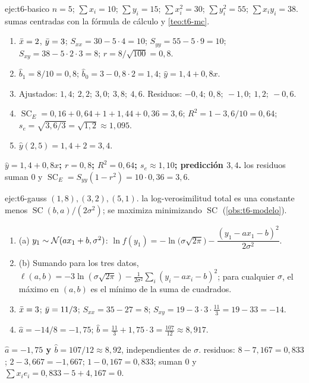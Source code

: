 \begin{solucion}{eje:t6-basico}
\datos $n=5$; $\sum x_i=10$; $\sum y_i=15$; $\sum x_i^{2}=30$; $\sum y_i^{2}=55$; $\sum x_iy_i=38$.
\planteamiento sumas centradas con la fórmula de cálculo y \cref{teo:t6-mc}.
\pasos
\begin{enumerate}[label=\arabic*.]
  \item $\bar{x}=2$, $\bar{y}=3$; $S_{xx}=30-5\cdot4=10$; $S_{yy}=55-5\cdot9=10$; $S_{xy}=38-5\cdot2\cdot3=8$; $r=8/\sqrt{100}=0{,}8$.
  \item $\widehat b_1=8/10=0{,}8$; $\widehat b_0=3-0{,}8\cdot2=1{,}4$; $\widehat y=1{,}4+0{,}8x$.
  \item Ajustados: $1{,}4;\allowbreak\ 2{,}2;\allowbreak\ 3{,}0;\allowbreak\ 3{,}8;\allowbreak\ 4{,}6$. Residuos: $-0{,}4;\allowbreak\ 0{,}8;\allowbreak\ -1{,}0;\allowbreak\ 1{,}2;\allowbreak\ -0{,}6$.
  \item $\operatorname{SC}_E=0{,}16+0{,}64+1+1{,}44+0{,}36=3{,}6$; $R^{2}=1-3{,}6/10=0{,}64$; $s_e=\sqrt{3{,}6/3}=\sqrt{1{,}2}\approx1{,}095$.
  \item $\widehat y(2{,}5)=1{,}4+2=3{,}4$.
\end{enumerate}
\resultado \textbf{$\widehat y=1{,}4+0{,}8x$; $r=0{,}8$; $R^{2}=0{,}64$; $s_e\approx1{,}10$; predicción $3{,}4$.}
\comprobacion los residuos suman $0$ y $\operatorname{SC}_E=S_{yy}(1-r^{2})=10\cdot0{,}36=3{,}6$.
\end{solucion}

\begin{solucion}{eje:t6-gauss}
\datos $(1,8),(3,2),(5,1)$.
\planteamiento la log-verosimilitud total es una constante menos $\operatorname{SC}(b,a)/(2\sigma^{2})$; se maximiza minimizando $\operatorname{SC}$ (\cref{obs:t6-modelo}).
\pasos
\begin{enumerate}[label=\arabic*.]
  \item (a) $y_1\sim\mathcal{N}(ax_1+b,\sigma^{2})$: $\ln f(y_1)=-\ln\bigl(\sigma\sqrt{2\pi}\bigr)-\dfrac{(y_1-ax_1-b)^{2}}{2\sigma^{2}}$.
  \item (b) Sumando para los tres datos, $\ell(a,b)=-3\ln(\sigma\sqrt{2\pi})-\frac{1}{2\sigma^{2}}\sum_i(y_i-ax_i-b)^{2}$; para cualquier $\sigma$, el máximo en $(a,b)$ es el mínimo de la suma de cuadrados.
  \item $\bar{x}=3$; $\bar{y}=11/3$; $S_{xx}=35-27=8$; $S_{xy}=19-3\cdot3\cdot\frac{11}3=19-33=-14$.
  \item $\widehat a=-14/8=-1{,}75$; $\widehat b=\frac{11}{3}+1{,}75\cdot3=\frac{107}{12}\approx8{,}917$.
\end{enumerate}
\resultado \textbf{$\widehat a=-1{,}75$ y $\widehat b=107/12\approx8{,}92$}, independientes de $\sigma$.
\comprobacion residuos: $8-7{,}167=0{,}833$; $2-3{,}667=-1{,}667$; $1-0{,}167=0{,}833$; suman $0$ y $\sum x_ie_i=0{,}833-5+4{,}167=0$.
\end{solucion}

